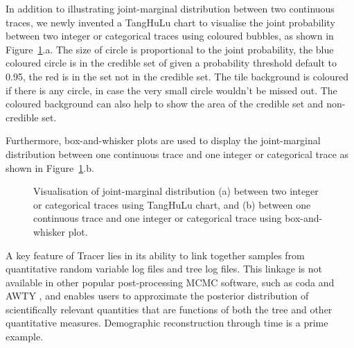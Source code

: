 \documentclass{bioinfo}
\begin{document}
In addition to illustrating joint-marginal distribution between two continuous traces, we newly invented a TangHuLu chart to visualise the joint probability between two integer or categorical traces using coloured bubbles, as shown in Figure~\ref{fig:tanghulu}.a. The size of circle is proportional to the joint probability, the blue coloured circle is in the credible set of given a probability threshold default to 0.95, the red is in the set not in the credible set. The tile background is coloured if there is any circle, in case the very small circle wouldn't be missed out. The coloured background can also help to show the area of the credible set and non-credible set.

Furthermore, box-and-whisker plots are used to display the joint-marginal distribution between one continuous trace and one integer or categorical trace as shown in Figure~\ref{fig:tanghulu}.b.

\begin{figure}[ht]
\caption{Visualisation of joint-marginal distribution (a) between two integer or categorical traces using TangHuLu chart, and (b) between one continuous trace and one integer or categorical trace using box-and-whisker plot.}
\label{fig:tanghulu}
\end{figure}

A key feature of Tracer lies in its ability to link together samples from quantitative random variable log files and tree log files.
This linkage is not available in other popular post-processing MCMC software, such as coda \citep{plummer2006coda} and AWTY \citep{nylander2007awty}, and enables users to approximate the posterior distribution of scientifically relevant quantities that are functions of both the tree and other quantitative measures.
Demographic reconstruction through time is a prime example.
\end{document}
